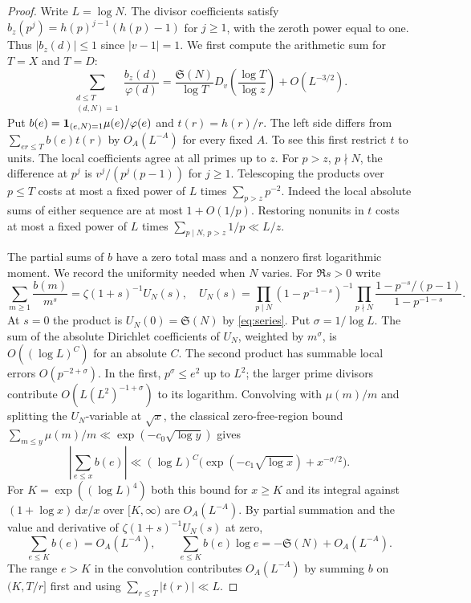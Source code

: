 \documentclass[11pt,a4paper]{article}
\numberwithin{equation}{section}
\newcommand{\SSS}{\mathfrak S}
\newcommand{\ud}{\mathrm d}
\begin{document}
\begin{proof}
Write $L=\log N$. The divisor coefficients satisfy
$b_z(p^j)=h(p)^{j-1}(h(p)-1)$ for $j\ge1$, with the zeroth
power equal to one. Thus $|b_z(d)|\le1$ since $|v-1|=1$.
We first compute the arithmetic sum for $T=X$ and $T=D$:
\begin{equation}
 \sum_{\substack{d\le T\\(d,N)=1}}\frac{b_z(d)}{\varphi(d)}
 =\frac{\SSS(N)}{\log T}D_v\left(\frac{\log T}{\log z}\right)
     +O(L^{-3/2}).
 \label{eq:single-test-twist-periodic}
\end{equation}
Put $b(e)={\bf1}_{(e,N)=1}\mu(e)/\varphi(e)$ and $t(r)=h(r)/r$.
The left side differs from $\sum_{er\le T}b(e)t(r)$ by
$O_A(L^{-A})$ for every fixed $A$. To see this first restrict
$t$ to units. The local coefficients agree at all primes up to
$z$. For $p>z$, $p\nmid N$, the difference at $p^j$ is
$v^j/(p^j(p-1))$ for $j\ge1$. Telescoping the products over
$p\le T$ costs at most a fixed power of $L$ times
$\sum_{p>z}p^{-2}$. Indeed the local absolute sums of either
sequence are at most $1+O(1/p)$. Restoring nonunits in $t$
costs at most a fixed power of $L$ times
$\sum_{p\mid N,\,p>z}1/p\ll L/z$.

The partial sums of $b$ have a zero total mass and a nonzero
first logarithmic moment. We record the uniformity needed when
$N$ varies. For $\Re s>0$ write
\[
 \sum_{m\ge1}\frac{b(m)}{m^s}=\zeta(1+s)^{-1}U_N(s),
 \quad U_N(s)=
 \prod_{p\mid N}(1-p^{-1-s})^{-1}
 \prod_{p\nmid N}\frac{1-p^{-s}/(p-1)}{1-p^{-1-s}}.
\]
At $s=0$ the product is $U_N(0)=\SSS(N)$ by \eqref{eq:series}.
Put $\sigma=1/\log L$. The sum of the absolute Dirichlet
coefficients of $U_N$, weighted by $m^\sigma$, is
$O((\log L)^C)$ for an absolute $C$. The second product has
summable local errors $O(p^{-2+\sigma})$. In the first,
$p^\sigma\le e^2$ up to $L^2$; the larger prime divisors
contribute $O(L(L^2)^{-1+\sigma})$ to its logarithm.
Convolving with $\mu(m)/m$ and splitting the $U_N$-variable
at $\sqrt x$, the classical zero-free-region bound
$\sum_{m\le y}\mu(m)/m\ll\exp(-c_0\sqrt{\log y})$ gives
\[
 \left|\sum_{e\le x} b(e)\right|
 \ll(\log L)^C\bigl(\exp(-c_1\sqrt{\log x})+x^{-\sigma/2}\bigr).
\]
For $K=\exp((\log L)^4)$ both this bound for $x\ge K$ and
its integral against $(1+\log x)\,\ud x/x$ over $[K,\infty)$
are $O_A(L^{-A})$. By partial summation and the value and
derivative of $\zeta(1+s)^{-1}U_N(s)$ at zero,
\[
 \sum_{e\le K} b(e)=O_A(L^{-A}),\qquad
 \sum_{e\le K} b(e)\log e=-\SSS(N)+O_A(L^{-A}).
\]
The range $e>K$ in the convolution contributes $O_A(L^{-A})$
by summing $b$ on $(K,T/r]$ first and using
$\sum_{r\le T}|t(r)|\ll L$.


\end{proof}
\end{document}
